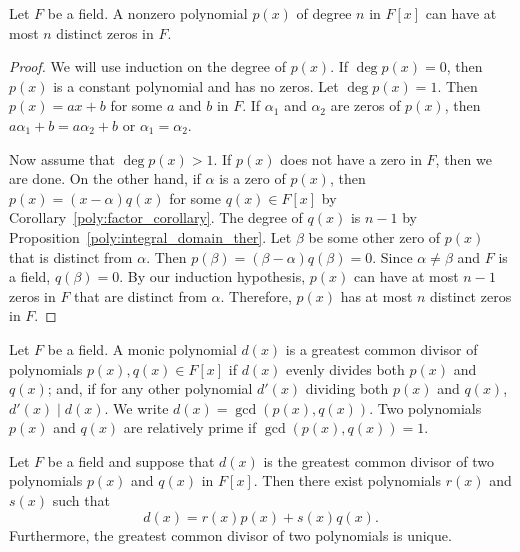  
\begin{corollary}\label{zeros_poly}
Let $F$ be a field. A nonzero polynomial $p(x)$ of degree $n$ in
$F[x]$ can have at most $n$ distinct zeros in $F$.  
\end{corollary}
 
 
\begin{proof}
We will use induction on the degree of $p(x)$. If $\deg p(x) = 0$,
then $p(x)$ is a constant polynomial and has no zeros.  Let $\deg p(x)
= 1$. Then $p(x) = ax +b$ for some $a$ and $b$ in $F$. If $\alpha_1$ and
$\alpha_2$ are zeros of $p(x)$, then $a\alpha_1 + b = a\alpha_2 +b$ or
$\alpha_1 = \alpha_2$. 
 
Now assume that $\deg p(x) > 1$. If $p(x)$ does not have a zero in
$F$, then we are done.  On the other hand, if $\alpha$ is a zero of
$p(x)$, then $p(x) = (x - \alpha ) q(x)$ for some $q(x) \in F[x]$ by
Corollary~\ref{poly:factor_corollary}. The degree of $q(x)$ is $n-1$ by Proposition~\ref{poly:integral_domain_ther}.
Let $\beta$ be some other zero of $p(x)$ that is distinct from
$\alpha$. Then $p(\beta) = (\beta - \alpha) q(\beta) = 0$. Since
$\alpha \neq \beta$ and $F$ is a field, $q(\beta ) = 0$. By our
induction hypothesis, $p(x)$ can have at most $n -1$ zeros in $F$ that
are distinct from $\alpha$. Therefore, $p(x)$ has at most $n$ distinct
zeros in $F$.
\end{proof}
 
 
\medskip
 
 
Let $F$ be a field.  A monic polynomial $d(x)$ is a {\bfi greatest
common divisor\/} of polynomials 
$p(x), q(x) \in F[x]$ if $d(x)$ evenly divides both $p(x)$ and $q(x)$;
and, if for any other polynomial $d'(x)$ dividing both $p(x)$ and
$q(x)$,  $d'(x) \mid d(x)$.  We write $d(x) = \gcd( p(x), q( x))$. Two
polynomials $p(x)$ and $q(x)$ are {\bfi relatively prime\/} if $\gcd(
p(x), q(x) ) = 1$. 
 
 
\begin{proposition}\label{poly:gcd_ther}
Let $F$ be a field and suppose that $d(x)$ is the greatest common
divisor of two polynomials $p(x)$ and $q(x)$ in $F[x]$. Then there
exist polynomials $r(x)$ and $s(x)$ such that
\[
d(x) = r(x) p(x) + s(x) q(x).
\]
Furthermore, the greatest common divisor of two polynomials is unique. 
\end{proposition}
 
